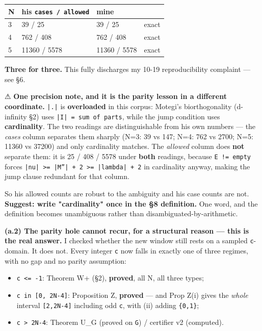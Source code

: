\documentclass[11pt,a4paper]{article}
\begin{document}
\begin{center}\footnotesize
\begin{tabular}{@{}p{}p{}p{}p{}@{}}
\hline
\textbf{N} & \textbf{his \mbox{\texttt{cases / allowed}}} & \textbf{mine} & \textbf{}\\ \hline
3 & 39 / 25 & 39 / 25 & exact\\
4 & 762 / 408 & 762 / 408 & exact\\
5 & 11360 / 5578 & 11360 / 5578 & exact\\
\hline\end{tabular}\end{center}

\textbf{Three for three.} This fully discharges my 10-19 reproducibility complaint --- see \S{}6.

⚠ \textbf{One precision note, and it is the parity lesson in a different coordinate.} \mbox{\texttt{|.|}} is \textbf{overloaded} in this corpus: Motegi's biorthogonality (d-infinity \S{}2) uses \mbox{\texttt{|I| = sum of parts}}, while the jump condition uses \textbf{cardinality}. The two readings are distinguishable from his own numbers --- the \emph{cases} column separates them sharply (N=3: 39 vs 147; N=4: 762 vs 2700; N=5: 11360 vs 37200) and only cardinality matches. The \emph{allowed} column does \textbf{not} separate them: it is 25 / 408 / 5578 under \textbf{both} readings, because \mbox{\texttt{E != empty}} forces \mbox{\texttt{|nu| >= |M''| + 2 >= |lambda| + 2}} in cardinality anyway, making the jump clause redundant for that column.

So his allowed counts are robust to the ambiguity and his case counts are not. \textbf{Suggest: write "cardinality" once in the \S{}8 definition.} One word, and the definition becomes unambiguous rather than disambiguated-by-arithmetic.

\textbf{(a.2) The parity hole cannot recur, for a structural reason --- this is the real answer.} I checked whether the new window still rests on a sampled \mbox{\texttt{c}}-domain. It does not. Every integer \mbox{\texttt{c}} now falls in exactly one of three regimes, with no gap and no parity assumption:

\begin{itemize}
\item \mbox{\texttt{c <= -1}}: Theorem W+ (\S{}2), \textbf{proved}, all N, all three types;
\item \mbox{\texttt{c in [0, 2N-4]}}: Proposition Z, \textbf{proved} --- and Prop Z(i) gives the \emph{whole} interval \mbox{\texttt{[2,2N-4]}} including odd \mbox{\texttt{c}}, with (ii) adding \mbox{\texttt{\{0,1\}}};
\item \mbox{\texttt{c > 2N-4}}: Theorem U\_G (proved on \mbox{\texttt{G}}) / certifier v2 (computed).
\end{itemize}
\end{document}
